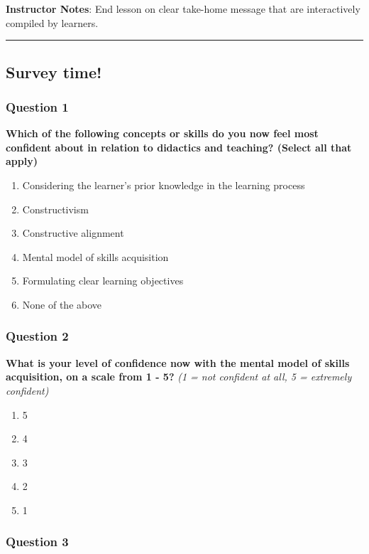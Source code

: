 \documentclass[
  letterpaper,
  DIV=11,
  numbers=noendperiod]{scrartcl}
\begin{document}
\textbf{Instructor Notes}: End lesson on clear take-home message that
are interactively compiled by learners.

\begin{center}\rule{0.5\linewidth}{0.5pt}\end{center}

\subsection{Survey time!}\label{survey-time-1}

\subsubsection{Question 1}

\textbf{Which of the following concepts or skills do you now feel most
confident about in relation to didactics and teaching? (Select all that
apply)}

\begin{enumerate}
\def\labelenumi{\alph{enumi}.}
\item
  Considering the learner's prior knowledge in the learning process
\item
  Constructivism
\item
  Constructive alignment
\item
  Mental model of skills acquisition
\item
  Formulating clear learning objectives
\item
  None of the above
\end{enumerate}

\subsubsection{Question 2}

\textbf{What is your level of confidence now with the mental model of
skills acquisition, on a scale from 1 - 5?} \emph{(1 = not confident at
all, 5 = extremely confident)}

\begin{enumerate}
\def\labelenumi{\alph{enumi}.}
\item
  5
\item
  4
\item
  3
\item
  2
\item
  1
\end{enumerate}

\subsubsection{Question 3}
\end{document}
